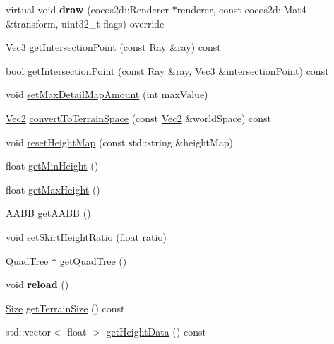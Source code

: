 \begin{DoxyCompactItemize}
\item 
\mbox{\label{classTerrain_a2d604fe7aa05986c5a0f92a61242003b}} 
virtual void {\bfseries draw} (cocos2d\+::\+Renderer $\ast$renderer, const cocos2d\+::\+Mat4 \&transform, uint32\+\_\+t flags) override
\item 
\hyperlink{classVec3}{Vec3} \hyperlink{classTerrain_ac958f761c3a0ffd913b6d201337fecc7}{get\+Intersection\+Point} (const \hyperlink{classRay}{Ray} \&ray) const
\item 
bool \hyperlink{classTerrain_a1455fb66bddeae92b522ce4523ed42f7}{get\+Intersection\+Point} (const \hyperlink{classRay}{Ray} \&ray, \hyperlink{classVec3}{Vec3} \&intersection\+Point) const
\item 
void \hyperlink{classTerrain_a8298eeb97583ef78a369151f0830c010}{set\+Max\+Detail\+Map\+Amount} (int max\+Value)
\item 
\hyperlink{classVec2}{Vec2} \hyperlink{classTerrain_a04ad6684b37690325940bf7e44d2a817}{convert\+To\+Terrain\+Space} (const \hyperlink{classVec2}{Vec2} \&world\+Space) const
\item 
void \hyperlink{classTerrain_a9fdf4b0a5b92fc5ac98c69dc41f7efab}{reset\+Height\+Map} (const std\+::string \&height\+Map)
\item 
float \hyperlink{classTerrain_af16a50d3b4818314a3c2ba8e7be6e0a1}{get\+Min\+Height} ()
\item 
float \hyperlink{classTerrain_a8a6f2132b654da2719044dc083297c0a}{get\+Max\+Height} ()
\item 
\hyperlink{classAABB}{A\+A\+BB} \hyperlink{classTerrain_a3bd1ac6219e1bfe32e7da26e9ab58646}{get\+A\+A\+BB} ()
\item 
void \hyperlink{classTerrain_a5a53caf1917be26897f35e35ae5b4f06}{set\+Skirt\+Height\+Ratio} (float ratio)
\item 
Quad\+Tree $\ast$ \hyperlink{classTerrain_af1d3cb372d1d3d555e7a820eac377605}{get\+Quad\+Tree} ()
\item 
\mbox{\label{classTerrain_ac7c6f714deaf475d98a32f6225a8943d}} 
void {\bfseries reload} ()
\item 
\hyperlink{classSize}{Size} \hyperlink{classTerrain_ae1fb00c2c35c35fd5e0274e037c624a2}{get\+Terrain\+Size} () const
\item 
std\+::vector$<$ float $>$ \hyperlink{classTerrain_ab8bbb0e74cb1271d052c91e40b8e2ebb}{get\+Height\+Data} () const
\item 
\mbox{\label{classTerrain_a66fd207f84be86a6203fd42ffb88579f}} 

\end{DoxyCompactItemize}
